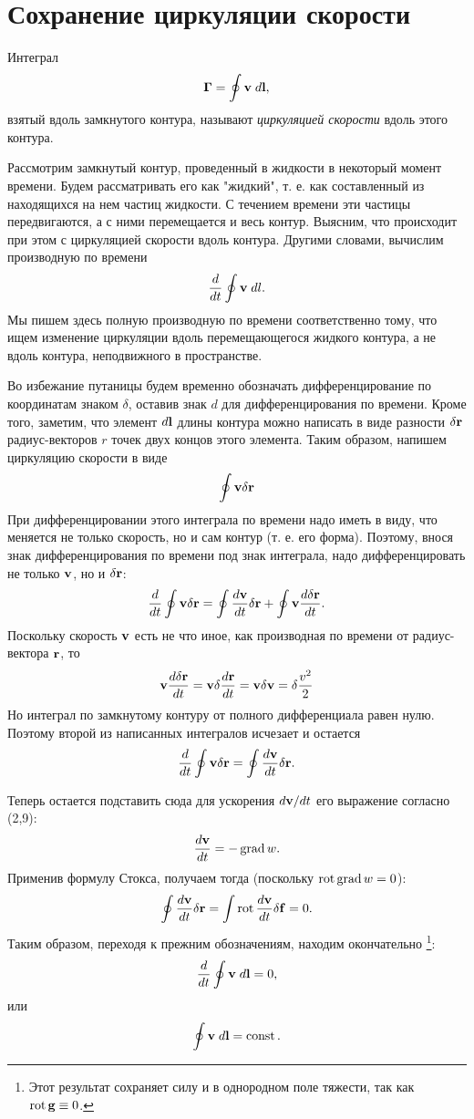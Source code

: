 \section{Сохранение циркуляции скорости}
\label{sec:p8}

Интеграл
\[
   \bm\Gamma = \oint { \mathbf{v} } \; d\mathbf{l},
\]
взятый вдоль замкнутого контура, называют \textit{циркуляцией скорости} вдоль
этого контура.

Рассмотрим замкнутый контур, проведенный в жидкости в некоторый момент времени.
Будем рассматривать его как "жидкий", т. е. как составленный из находящихся на
нем частиц жидкости. С течением времени эти частицы передвигаются, а с ними
перемещается и весь контур. Выясним, что происходит при этом с циркуляцией
скорости вдоль контура. Другими словами, вычислим производную по времени
\[
   \frac{d}{dt}\oint { \mathbf{v} }\; dl.
\]
Мы пишем здесь полную производную по времени соответственно тому, что ищем
изменение циркуляции вдоль перемещающегося жидкого контура, а не вдоль контура,
неподвижного в пространстве.

Во избежание путаницы будем временно обозначать дифференцирование по координатам
знаком $\delta$, оставив знак $d$ для дифференцирования по времени. Кроме того,
заметим, что элемент $d\mathbf{l}$ длины контура можно написать в виде разности
$\delta\mathbf{r}$ радиус-векторов $r$ точек двух концов этого элемента. Таким
образом, напишем циркуляцию скорости в виде
\[
   \oint{ \mathbf{v} }\delta\mathbf{r}
\]
При дифференцировании этого интеграла по времени надо иметь в виду, что меняется
не только скорость, но и сам контур (т. е. его форма). Поэтому, внося знак
дифференцирования по времени под знак интеграла, надо дифференцировать не только
${\mathbf{v}}$, но и $\delta\mathbf{r}$:
\[
   \frac{d}{dt}\oint{ \mathbf{v} }\delta\mathbf{r} = \oint{\frac{d{{ \mathbf{v} }}}{d{t}}\delta \mathbf{r} }+\oint{{ \mathbf{v} }\frac{d{\delta \mathbf{r} }}{d{t}}}.
\]
Поскольку скорость ${\mathbf{v}}$ есть не что иное, как производная по времени от
радиус-вектора $\mathbf{r}$, то
\[
   {\mathbf{v}} \frac{d{\delta\mathbf{r}}}{d{t}} = {\mathbf{v}}\delta\frac{d{\mathbf{r}}}{d{t}} = {\mathbf{v}}\delta{ \mathbf{v} } = \delta \frac{v^2}{2}
\]
Но интеграл по замкнутому контуру от полного дифференциала равен нулю. Поэтому
второй из написанных интегралов исчезает и остается
\[
   \frac{d}{dt}\oint { \mathbf{v} } \delta\mathbf{r} = \oint{\frac{d{{ \mathbf{v} }}}{d{t}}\delta \mathbf{r} }.
\]

Теперь остается подставить сюда для ускорения $d{\mathbf{v}}/dt$ его выражение согласно
(2,9):
\[
   \frac{d{{\mathbf{v}}}}{d{t}} = - \mathop{\mathrm{grad}}\nolimits w.
\]
Применив формулу Стокса, получаем тогда (поскольку $\mathop{\mathrm{rot}}\nolimits \mathop{\mathrm{grad}}\nolimits w = 0$):
\[
   \oint{\frac{d{{ \mathbf{v} }}}{d{t}}\delta \mathbf{r} } = \int{\mathop{\mathrm{rot}}\nolimits\frac{d{{ \mathbf{v} }}}{d{t}}\delta  \mathbf{f} } = 0.
\]
Таким образом, переходя к прежним обозначениям, находим окончательно
\footnote{Этот результат сохраняет силу и в однородном поле тяжести, так как
$\mathop{\mathrm{rot}}\nolimits \mathbf{g} \equiv 0$.}:
\[
   \frac{d}{dt}\oint { \mathbf{v} }\; d \mathbf{l} = 0,
\]
или
\begin{equation}
   \label{eq:8.1}
   \oint { \mathbf{v} }\; d \mathbf{l} = \mathop{\mathrm{const}}\nolimits.
\end{equation}

